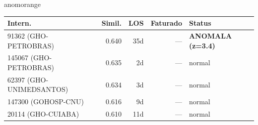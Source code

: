 \documentclass[a4paper,10pt]{article}
\begin{document}
\begin{anomalycard}[Internacao 164373 | GHO-PETROBRAS | ALTO (z=3.38)]{anomorange}
\begin{tabular}{l r r r l}\toprule\textbf{Intern.} & \textbf{Simil.} & \textbf{LOS} & \textbf{Faturado} & \textbf{Status} \\\midrule
91362 (GHO-PETROBRAS) & 0.640 & 35d & --- & \textcolor{anomred}{\textbf{ANOMALA (z=3.4)}} \\
145067 (GHO-PETROBRAS) & 0.635 & 2d & --- & \textcolor{jcubeblue}{normal} \\
62397 (GHO-UNIMEDSANTOS) & 0.634 & 3d & --- & \textcolor{jcubeblue}{normal} \\
147300 (GOHOSP-CNU) & 0.616 & 9d & --- & \textcolor{jcubeblue}{normal} \\
20114 (GHO-CUIABA) & 0.610 & 11d & --- & \textcolor{jcubeblue}{normal} \\
\bottomrule\end{tabular}



\end{anomalycard}

\newpage
\end{document}

